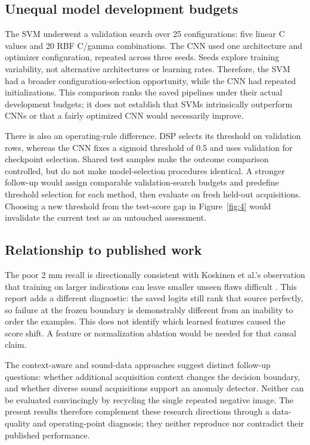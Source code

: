\documentclass[11pt,a4paper]{article}
\begin{document}
\subsection{Unequal model development budgets}

The SVM underwent a validation search over 25 configurations: five linear C values and 20 RBF C/gamma combinations. The CNN used one architecture and optimizer configuration, repeated across three seeds. Seeds explore training variability, not alternative architectures or learning rates. Therefore, the SVM had a broader configuration-selection opportunity, while the CNN had repeated initializations. This comparison ranks the saved pipelines under their actual development budgets; it does not establish that SVMs intrinsically outperform CNNs or that a fairly optimized CNN would necessarily improve.

There is also an operating-rule difference. DSP selects its threshold on validation rows, whereas the CNN fixes a sigmoid threshold of 0.5 and uses validation for checkpoint selection. Shared test samples make the outcome comparison controlled, but do not make model-selection procedures identical. A stronger follow-up would assign comparable validation-search budgets and predefine threshold selection for each method, then evaluate on fresh held-out acquisitions. Choosing a new threshold from the test-score gap in Figure~\ref{fig:4} would invalidate the current test as an untouched assessment.

\subsection{Relationship to published work}

The poor 2 mm recall is directionally consistent with Koskinen et al.'s observation that training on larger indications can leave smaller unseen flaws difficult \cite{ref2}. This report adds a different diagnostic: the saved logits still rank that source perfectly, so failure at the frozen boundary is demonstrably different from an inability to order the examples. This does not identify which learned features caused the score shift. A feature or normalization ablation would be needed for that causal claim.

The context-aware and sound-data approaches \cite{ref5,ref6} suggest distinct follow-up questions: whether additional acquisition context changes the decision boundary, and whether diverse sound acquisitions support an anomaly detector. Neither can be evaluated convincingly by recycling the single repeated negative image. The present results therefore complement these research directions through a data-quality and operating-point diagnosis; they neither reproduce nor contradict their published performance.
\end{document}
